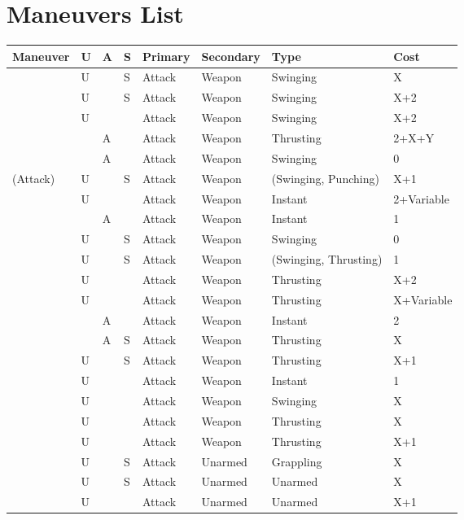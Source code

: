 \documentclass[oneside,11pt,english]{book}
\begin{document}
\section{Maneuvers List}\label{sec:maneuvers-list}
\begin{longtabu} to 
Maneuver& U &A &S &Primary &Secondary &Type &Cost\\\toprule
{} &U &&S &Attack&Weapon&Swinging& X \\
 &U &&S &Attack&Weapon&Swinging& X+2 \\
 &U&& &Attack&Weapon&Swinging& X+2 \\
 &&A& &Attack&Weapon&Thrusting& 2+X+Y \\
 &&A& &Attack&Weapon&Swinging& 0 \\
 (Attack) &U&& S &Attack&Weapon& (Swinging, Punching) &X+1\\
 &U&& &Attack&Weapon&Instant& 2+Variable\\
 &  &A &  &Attack&Weapon&Instant& 1\\
  &U&&S &Attack&Weapon&Swinging& 0 \\
 &U&&S &Attack&Weapon& (Swinging, Thrusting) &1\\
 &U&& &Attack&Weapon&Thrusting& X+2\\
 &U &&&Attack&Weapon&Thrusting& X+Variable\\
 &&A& &Attack&Weapon&Instant& 2\\
 &&A& S &Attack&Weapon&Thrusting& X \\
 &U&& S &Attack&Weapon&Thrusting& X+1\\
 &U&&&Attack&Weapon&Instant& 1 \\
 &U&& &Attack&Weapon&Swinging& X \\
 &U&& &Attack&Weapon&Thrusting& X \\
 &U&& &Attack&Weapon&Thrusting& X+1 \\
 &U&& S& Attack &Unarmed &Grappling &X\\
 &U&& S &Attack &Unarmed &Unarmed & X \\
 &U &&&Attack &Unarmed &Unarmed & X+1 \\

\end{longtabu}
\end{document}
